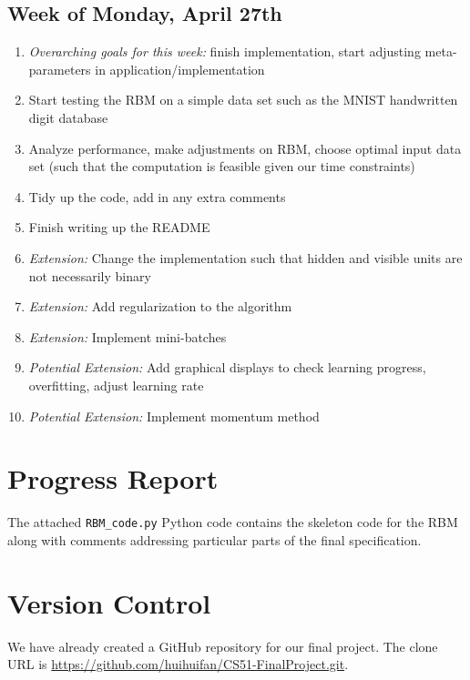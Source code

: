 \documentclass[12pt]{article}
\begin{document}
\subsection{Week of Monday, April 27th}
\begin{enumerate}
  \item \textit{Overarching goals for this week:} finish implementation, start adjusting meta-parameters in application/implementation
  \item Start testing the RBM on a simple data set such as the MNIST handwritten digit database
  \item Analyze performance, make adjustments on RBM, choose optimal input data set (such that the computation is feasible given our time constraints)
  \item Tidy up the code, add in any extra comments
  \item Finish writing up the README
  \item \textit{Extension:} Change the implementation such that hidden and visible units are not necessarily binary
  \item \textit{Extension:} Add regularization to the algorithm
  \item \textit{Extension:} Implement mini-batches
  \item \textit{Potential Extension:} Add graphical displays to check learning progress, overfitting, adjust learning rate
  \item \textit{Potential Extension:} Implement momentum method
\end{enumerate}


\section{Progress Report}
The attached \texttt{RBM\_code.py} Python code contains the skeleton code for the RBM along with comments addressing particular parts of the final specification.


\section{Version Control}
We have already created a GitHub repository for our final project. The clone URL is \url{https://github.com/huihuifan/CS51-FinalProject.git}. 
\end{document}
